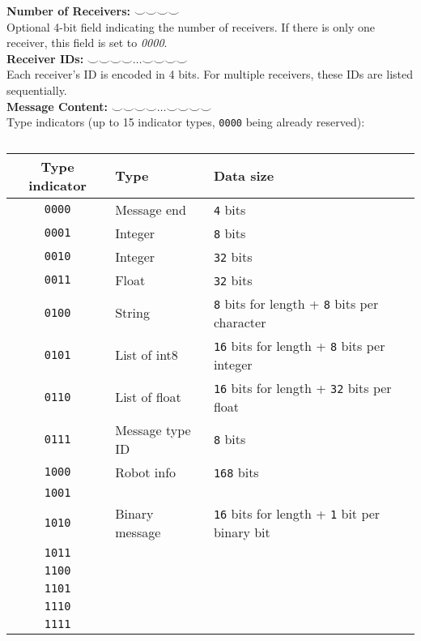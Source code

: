 \documentclass[main.tex]{subfiles}
\begin{document}
\textbf{Number of Receivers:} $\smallsmile \smallsmile \smallsmile \smallsmile$\\
Optional 4-bit field indicating the number of receivers. If there is only one receiver, this field is set to \textit{0000}.\\

\textbf{Receiver IDs:} $\smallsmile \smallsmile \smallsmile \smallsmile \dots \smallsmile \smallsmile \smallsmile \smallsmile$\\
Each receiver's ID is encoded in 4 bits. For multiple receivers, these IDs are listed sequentially.\\

\textbf{Message Content:} $\smallsmile \smallsmile \smallsmile \smallsmile \dots \smallsmile \smallsmile \smallsmile \smallsmile$\\

Type indicators (up to 15 indicator types, \texttt{0000} being already reserved):\\
\begin{table}[H]
	\centering
	\begin{tabular}{c l l}
		\hline
		Type indicator & Type & Data size\\
		\hline
		\texttt{0000} & Message end & \texttt{4} bits\\
		\texttt{0001} & Integer & \texttt{8} bits\\
		\texttt{0010} & Integer & \texttt{32} bits\\
		\texttt{0011} & Float & \texttt{32} bits\\
		\texttt{0100} & String & \texttt{8} bits for length + \texttt{8} bits per character\\
		\texttt{0101} & List of int8 & \texttt{16} bits for length + \texttt{8} bits per integer\\
		\texttt{0110} & List of float & \texttt{16} bits for length + \texttt{32} bits per float\\
		\texttt{0111} & Message type ID & \texttt{8} bits\\
		\texttt{1000} & Robot info & \texttt{168} bits\\
		\texttt{1001} & & \\
		\texttt{1010} & Binary message & \texttt{16} bits for length + \texttt{1} bit per binary bit\\
		\texttt{1011} & & \\
		\texttt{1100} & & \\
		\texttt{1101} & & \\
		\texttt{1110} & & \\
		\texttt{1111} & & \\
		\hline
	\end{tabular}
	\caption{}
\end{table}
\end{document}
